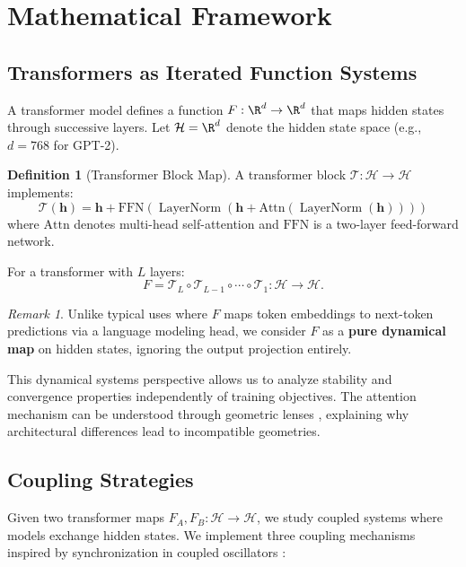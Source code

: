 \documentclass[10pt]{article} %
\theoremstyle{plain}
\theoremstyle{definition}
\newtheorem{definition}[theorem]{Definition}
\theoremstyle{remark}
\newtheorem{remark}[theorem]{Remark}
\newcommand{\cH}{\mathcal{H}}
\newcommand{\cT}{\mathcal{T}}
\renewcommand{\vect}[1]{\bm{#1}}
\DeclareMathOperator{\LayerNorm}{LayerNorm}
\begin{document}
\section{Mathematical Framework}

\subsection{Transformers as Iterated Function Systems}

A transformer model defines a function $F: \R^d \to \R^d$ that maps hidden states through successive layers. Let $\cH = \R^d$ denote the hidden state space (e.g., $d = 768$ for GPT-2).

\begin{definition}[Transformer Block Map]
A transformer block $\cT: \cH \to \cH$ implements:
\begin{equation}
    \cT(\vect{h}) = \vect{h} + \text{FFN}\left(\LayerNorm\left(\vect{h} + \text{Attn}(\LayerNorm(\vect{h}))\right)\right)
\end{equation}
where $\text{Attn}$ denotes multi-head self-attention and $\text{FFN}$ is a two-layer feed-forward network.
\end{definition}

For a transformer with $L$ layers:
\begin{equation}
    F = \mathcal{T}_L \circ \mathcal{T}_{L-1} \circ \cdots \circ \mathcal{T}_1 : \cH \to \cH.
\end{equation}

\begin{remark}
Unlike typical uses where $F$ maps token embeddings to next-token predictions via a language modeling head, we consider $F$ as a \textbf{pure dynamical map} on hidden states, ignoring the output projection entirely.
\end{remark}

This dynamical systems perspective \cite{haber2017stable,chen2018neuralode} allows us to analyze stability and convergence properties independently of training objectives. The attention mechanism can be understood through geometric lenses \cite{tsai2019transformer}, explaining why architectural differences lead to incompatible geometries.

\subsection{Coupling Strategies}

Given two transformer maps $F_A, F_B: \cH \to \cH$, we study coupled systems where models exchange hidden states. We implement three coupling mechanisms inspired by synchronization in coupled oscillators \cite{kuramoto1984chemical}:
\end{document}

